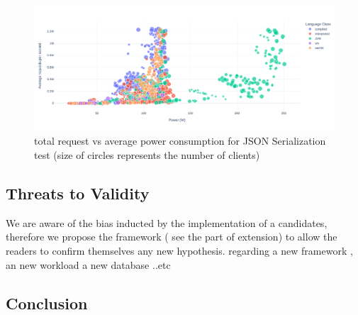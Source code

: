 \begin{figure}[hbt]
    \centering
    \includegraphics[width=\textwidth,height=\textheight,keepaspectratio]{imgs/power_requests_json}
    \caption{total request vs average power consumption for JSON Serialization test (size of circles represents the number of clients)}
    \label{fig:power_requests_json}
\end{figure}
\subsection{Threats to Validity}
We are aware of the bias inducted by the implementation of a candidates, therefore we propose  the framework ( see the part of extension) to allow the readers to confirm themselves any new hypothesis. regarding a new framework , an new workload a new database ..etc

\subsection{Conclusion}

